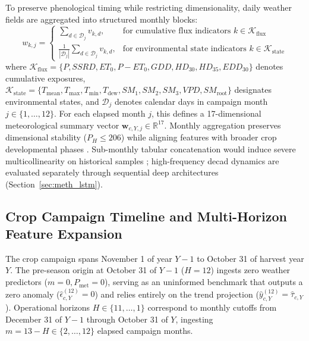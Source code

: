 To preserve phenological timing while restricting dimensionality, daily weather fields are aggregated into structured monthly blocks:
\begin{equation}
    w_{k, j} = 
    \begin{cases}
        \displaystyle \sum_{d \in \mathcal{D}_j} v_{k, d}, & \text{for cumulative flux indicators } k \in \mathcal{K}_{\text{flux}} \\[2.5ex]
        \displaystyle \frac{1}{|\mathcal{D}_j|} \sum_{d \in \mathcal{D}_j} v_{k, d}, & \text{for environmental state indicators } k \in \mathcal{K}_{\text{state}}
    \end{cases}
    \label{eq:monthly_aggregation_rule}
\end{equation}
where $\mathcal{K}_{\text{flux}} = \{P, SSRD, ET_0, P-ET_0, GDD, HD_{30}, HD_{35}, EDD_{30}\}$ denotes cumulative exposures, $\mathcal{K}_{\text{state}} = \{T_{\text{mean}}, T_{\text{max}}, T_{\text{min}}, T_{\text{dew}}, SM_1, SM_2, SM_3, VPD, SM_{\text{root}}\}$ designates environmental states, and $\mathcal{D}_j$ denotes calendar days in campaign month $j \in \{1, \dots, 12\}$. For each elapsed month $j$, this defines a 17-dimensional meteorological summary vector $\mathbf{w}_{c,Y,j} \in \mathbb{R}^{17}$. Monthly aggregation preserves dimensional stability ($P_H \le 206$) while aligning features with broader crop developmental phases \citep{Hoffman2020}. Sub-monthly tabular concatenation would induce severe multicollinearity on historical samples \citep{Sharmaetal2025}; high-frequency decad dynamics are evaluated separately through sequential deep architectures (Section~\ref{sec:meth_lstm}).

\subsection{Crop Campaign Timeline and Multi-Horizon Feature Expansion}
\label{sec:meth_timeline_horizons}

The crop campaign spans November 1 of year $Y-1$ to October 31 of harvest year $Y$. The pre-season origin at October 31 of $Y-1$ ($H=12$) ingests zero weather predictors ($m=0, P_{\text{met}}=0$), serving as an uninformed benchmark that outputs a zero anomaly ($\hat{\epsilon}_{c,Y}^{(12)} = 0$) and relies entirely on the trend projection ($\hat{y}_{c,Y}^{(12)} = \hat{\tau}_{c,Y}$). Operational horizons $H \in \{11, \dots, 1\}$ correspond to monthly cutoffs from December 31 of $Y-1$ through October 31 of $Y$, ingesting $m = 13 - H \in \{2, \dots, 12\}$ elapsed campaign months.

